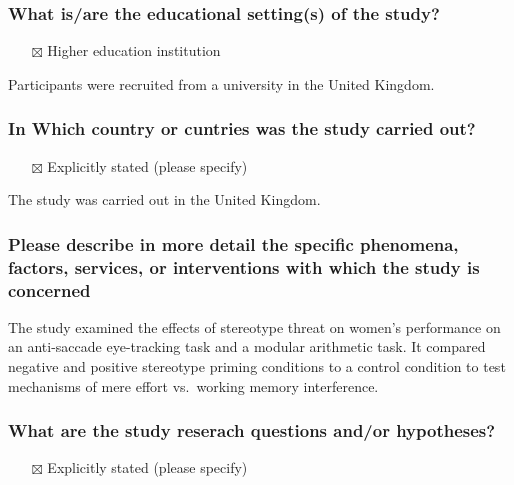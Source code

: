 \documentclass[
  doc, a4paper]{apa7}
\providecommand{\tightlist}{%
  \setlength{\itemsep}{0pt}\setlength{\parskip}{0pt}}
\begin{document}
\subsubsection{What is/are the educational setting(s) of the study?}\label{what-isare-the-educational-settings-of-the-study}

\begin{itemize}
\tightlist
\item[$\boxtimes$]
  Higher education institution
\end{itemize}

Participants were recruited from a university in the United Kingdom.

\subsubsection{In Which country or cuntries was the study carried out?}\label{in-which-country-or-cuntries-was-the-study-carried-out}

\begin{itemize}
\tightlist
\item[$\boxtimes$]
  Explicitly stated (please specify)
\end{itemize}

The study was carried out in the United Kingdom.

\subsubsection{Please describe in more detail the specific phenomena, factors, services, or interventions with which the study is concerned}\label{please-describe-in-more-detail-the-specific-phenomena-factors-services-or-interventions-with-which-the-study-is-concerned}

The study examined the effects of stereotype threat on women's performance on an anti-saccade eye-tracking task and a modular arithmetic task. It compared negative and positive stereotype priming conditions to a control condition to test mechanisms of mere effort vs.~working memory interference.

\subsubsection{What are the study reserach questions and/or hypotheses?}\label{what-are-the-study-reserach-questions-andor-hypotheses}

\begin{itemize}
\tightlist
\item[$\boxtimes$]
  Explicitly stated (please specify)
\end{itemize}
\end{document}
